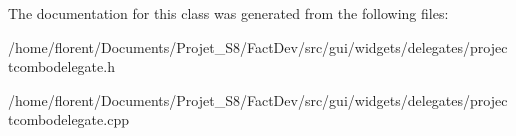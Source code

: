The documentation for this class was generated from the following files\-:\begin{DoxyCompactItemize}
\item 
/home/florent/\-Documents/\-Projet\-\_\-\-S8/\-Fact\-Dev/src/gui/widgets/delegates/projectcombodelegate.\-h\item 
/home/florent/\-Documents/\-Projet\-\_\-\-S8/\-Fact\-Dev/src/gui/widgets/delegates/projectcombodelegate.\-cpp\end{DoxyCompactItemize}
